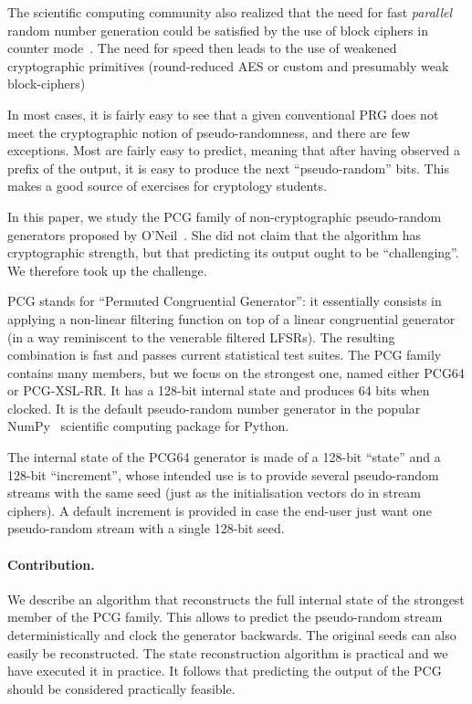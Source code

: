 \documentclass[submission,svgnames,journal=tosc]{iacrtrans}
\begin{document}
The scientific computing community also realized that the need for fast
\emph{parallel} random number generation could be satisfied by the use of block
ciphers in counter mode~\cite{Salmon11}. The need for speed then leads to the
use of weakened cryptographic primitives (round-reduced AES or custom and
presumably weak block-ciphers)

In most cases, it is fairly easy to see that a given conventional PRG does not
meet the cryptographic notion of pseudo-randomness, and there are few
exceptions. Most are fairly easy to predict, meaning that after having observed
a prefix of the output, it is easy to produce the next ``pseudo-random''
bits. This makes a good source of exercises for cryptology students.

In this paper, we study the \textsf{PCG} family of non-cryptographic
pseudo-random generators proposed by O'Neil~\cite{melissapaper,melissaweb}. She
did not claim that the algorithm has cryptographic strength, but that predicting
its output ought to be ``challenging''. We therefore took up the challenge.

\textsf{PCG} stands for ``Permuted Congruential Generator'': it essentially
consists in applying a non-linear filtering function on top of a linear
congruential generator (in a way reminiscent to the venerable filtered
LFSRs). The resulting combination is fast and passes current statistical test
suites. The \textsf{PCG} family contains many members, but we focus on the
strongest one, named either \textsf{PCG64} or \textsf{PCG-XSL-RR}. It has a
128-bit internal state and produces 64 bits when clocked. It is the default
pseudo-random number generator in the popular \textsf{NumPy}~\cite{Numpy}
scientific computing package for \textsf{Python}.

The internal state of the \textsf{PCG64} generator is made of a 128-bit
``state'' and a 128-bit ``increment'', whose intended use is to provide several
pseudo-random streams with the same seed (just as the initialisation vectors do
in stream ciphers). A default increment is provided in case the end-user just
want one pseudo-random stream with a single 128-bit seed.

\paragraph{Contribution.} We describe an algorithm that reconstructs the full
internal state of the strongest member of the \textsf{PCG} family. This allows
to predict the pseudo-random stream deterministically and clock the generator
backwards. The original seeds can also easily be reconstructed. The state
reconstruction algorithm is practical and we have executed it in practice. It
follows that predicting the output of the \textsf{PCG} should be considered
practically feasible.
\end{document}
